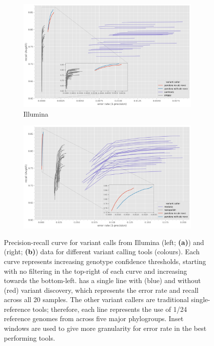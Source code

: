 \begin{figure}
     \begin{subfigure}[b]{0.475\textwidth}
        \includegraphics[width=1\linewidth]{Chapter1/Figs/illumina_roc.png}
        \centering
        \caption{Illumina}
        \label{fig:pandora-roc-illumina}
     \end{subfigure}
     \begin{subfigure}[b]{0.475\textwidth}
         \centering
        \includegraphics[width=1\linewidth]{Chapter1/Figs/nanopore_roc.png}
         \caption{\ont{}}
         \label{fig:pandora-roc-ont}
     \end{subfigure}
    \caption{Precision-recall curve for variant calls from Illumina (left; \textbf{(a)}) and \ont{} (right; \textbf{(b)}) data for different variant calling tools (colours). Each curve represents increasing genotype confidence thresholds, starting with no filtering in the top-right of each curve and increasing towards the bottom-left. \pandora{} has a single line with (blue) and without (red) \denovo{} variant discovery, which represents the error rate and recall across all 20 samples. The other variant callers are traditional single-reference tools; therefore, each line represents the use of 1/24 reference genomes from across five major \ecoli{} phylogroups. Inset windows are used to give more granularity for error rate in the best performing tools.}

\end{figure}
